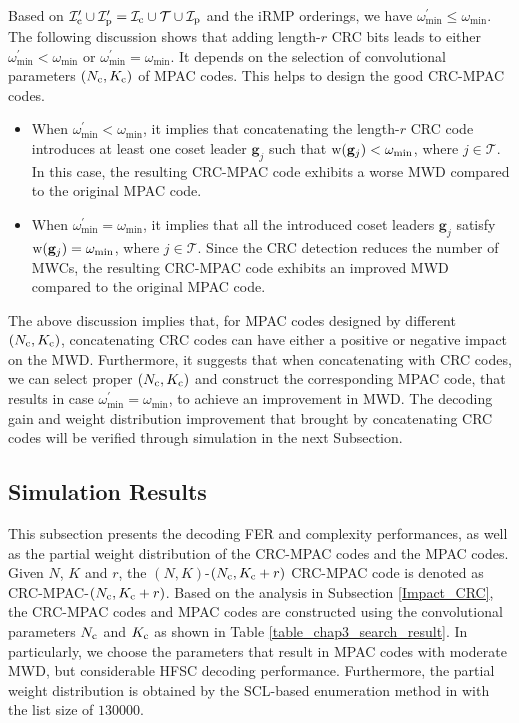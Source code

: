 \documentclass[12pt, draftclsnofoot, peerreview, onecolumn]{IEEEtran}
\theoremstyle{noparent}
\begin{document}
Based on $\mathcal{I}_{\rm c}^{\prime} \cup \mathcal{I}_{\rm p}^{\prime}=
\mathcal{I}_{\rm c} \cup \mathcal{T} \cup \mathcal{I}_{\rm p}$ and the iRMP orderings,
we have $\omega_{\min}^{\prime}\le \omega_{\min}$.
The following discussion shows that adding length-$r$ CRC bits
leads to either $\omega_{\min}^{\prime}<\omega_{\min}$ or 
$\omega_{\min}^{\prime}=\omega_{\min}$.
It depends on the selection of convolutional parameters $(N_{\rm c}, K_{\rm c})$ of MPAC codes.
This helps to design the good CRC-MPAC codes.
\begin{itemize}
    \item When $\omega_{\min}^{\prime}<\omega_{\min}$, it implies that concatenating the length-$r$
    CRC code introduces at least one coset leader $\mathbf{g}_j$ such that
    ${{\rm w}(\mathbf{g}_j)}<\omega_{\min}$, where $j\in \mathcal{T}$.
    In this case, the resulting CRC-MPAC code exhibits a worse MWD compared to the original MPAC code.
    
    \item When $\omega_{\min}^{\prime}=\omega_{\min}$, it implies that all the introduced 
    coset leaders $\mathbf{g}_j$ satisfy ${{\rm w}(\mathbf{g}_j)}=\omega_{\min}$, 
    where $j\in \mathcal{T}$. 
    Since the CRC detection reduces the number of MWCs, 
    the resulting CRC-MPAC code exhibits an improved MWD compared to the original MPAC code.
\end{itemize}

The above discussion implies that, for MPAC codes designed by different $(N_{\rm c}, K_{\rm c})$,
concatenating CRC codes can have either a positive or negative impact on the MWD.
Furthermore, it suggests that when concatenating with CRC codes,
we can select proper $(N_{\rm c}, K_{\rm c})$ and construct the corresponding MPAC code, 
that results in case $\omega_{\min}^{\prime}=\omega_{\min}$, 
to achieve an improvement in MWD.
The decoding gain and weight distribution improvement that brought by concatenating CRC codes 
will be verified through simulation in the next Subsection.


\subsection{Simulation Results}
\label{sec5_Simulation_Results}

This subsection presents the decoding FER and complexity performances, 
as well as the partial weight distribution of the CRC-MPAC codes and the MPAC codes.
Given $N$, $K$ and $r$, the $(N,K)$-$(N_{\rm c}, K_{\rm c}+r)$ CRC-MPAC code 
is denoted as CRC-MPAC-$(N_{\rm c}, K_{\rm c}+r)$.
Based on the analysis in Subsection \ref{Impact_CRC}, the CRC-MPAC codes and 
MPAC codes are constructed using the convolutional parameters $N_{\rm c}$
and $K_{\rm c}$ as shown in Table \ref{table_chap3_search_result}. 
In particularly, we choose the parameters that result in MPAC codes with moderate MWD, 
but considerable HFSC decoding performance.
Furthermore, the partial weight distribution is obtained by the SCL-based enumeration method 
in \cite{Li2012AdaptiveSuccessiveCancellation} with the list size of $130000$.
\end{document}
